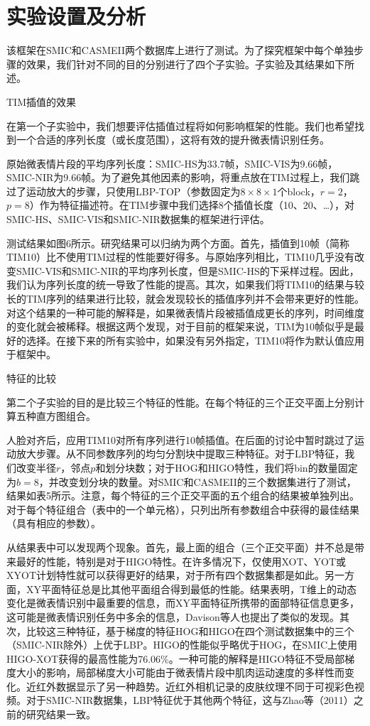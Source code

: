 \section{实验设置及分析}
\label{exp}

该框架在SMIC和CASMEII两个数据库上进行了测试。为了探究框架中每个单独步骤的效果，我们针对不同的目的分别进行了四个子实验。子实验及其结果如下所述。

TIM插值的效果

在第一个子实验中，我们想要评估插值过程将如何影响框架的性能。我们也希望找到一个合适的序列长度（或长度范围），这将有效的提升微表情识别任务。

原始微表情片段的平均序列长度：SMIC-HS为33.7帧，SMIC-VIS为9.66帧，SMIC-NIR为9.66帧。为了避免其他因素的影响，将重点放在TIM过程上，我们跳过了运动放大的步骤，只使用LBP-TOP（参数固定为$8\times8\times1$个block，$r = 2$，$p = 8$）作为特征描述符。在TIM步骤中我们选择8个插值长度（10、20、…），对SMIC-HS、SMIC-VIS和SMIC-NIR数据集的框架进行评估。

测试结果如图6所示。研究结果可以归纳为两个方面。首先，插值到10帧（简称TIM10）比不使用TIM过程的性能要好得多。与原始序列相比，TIM10几乎没有改变SMIC-VIS和SMIC-NIR的平均序列长度，但是SMIC-HS的下采样过程。因此，我们认为序列长度的统一导致了性能的提高。其次，如果我们将TIM10的结果与较长的TIM序列的结果进行比较，就会发现较长的插值序列并不会带来更好的性能。对这个结果的一种可能的解释是，如果微表情片段被插值成更长的序列，时间维度的变化就会被稀释。根据这两个发现，对于目前的框架来说，TIM为10帧似乎是最好的选择。在接下来的所有实验中，如果没有另外指定，TIM10将作为默认值应用于框架中。

特征的比较

第二个子实验的目的是比较三个特征的性能。在每个特征的三个正交平面上分别计算五种直方图组合。

人脸对齐后，应用TIM10对所有序列进行10帧插值。在后面的讨论中暂时跳过了运动放大步骤。从不同参数序列的均匀分割块中提取三种特征。对于LBP特征，我们改变半径$r$，邻点$p$和划分块数；对于HOG和HIGO特性，我们将bin的数量固定为$b = 8$，并改变划分块的数量。对SMIC和CASMEII的三个数据集进行了测试，结果如表5所示。注意，每个特征的三个正交平面的五个组合的结果被单独列出。对于每个特征组合（表中的一个单元格），只列出所有参数组合中获得的最佳结果（具有相应的参数）。

从结果表中可以发现两个现象。首先，最上面的组合（三个正交平面）并不总是带来最好的性能，特别是对于HIGO特性。在许多情况下，仅使用XOT、YOT或XYOT计划特性就可以获得更好的结果，对于所有四个数据集都是如此。另一方面，XY平面特征总是比其他平面组合得到最低的性能。结果表明，T维上的动态变化是微表情识别中最重要的信息，而XY平面特征所携带的面部特征信息更多，这可能是微表情识别任务中多余的信息，Davison等人也提出了类似的发现。其次，比较这三种特征，基于梯度的特征HOG和HIGO在四个测试数据集中的三个（SMIC-NIR除外）上优于LBP。HIGO的性能似乎略优于HOG，在SMIC上使用HIGO-XOT获得的最高性能为76.06\%。一种可能的解释是HIGO特征不受局部梯度大小的影响，局部梯度大小可能由于微表情片段中肌肉运动速度的多样性而变化。近红外数据显示了另一种趋势。近红外相机记录的皮肤纹理不同于可视彩色视频。对于SMIC-NIR数据集，LBP特征优于其他两个特征，这与Zhao等（2011）之前的研究结果一致。

